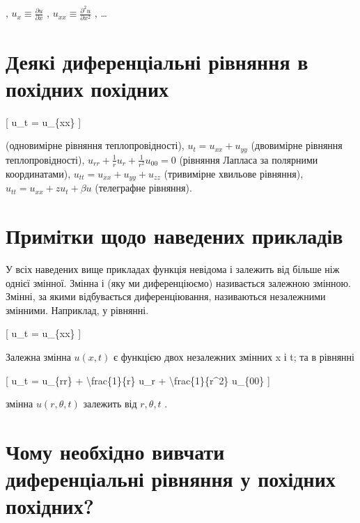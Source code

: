 \documentclass[
]{article}
\begin{document}
, \(u_x \equiv \frac{\partial u}{\partial x}\) ,
\(u_{xx} \equiv \frac{\partial^2 u}{\partial x^2}\) , \ldots{}

\section{Деякі диференціальні рівняння в похідних
похідних}\label{ux434ux435ux44fux43aux456-ux434ux438ux444ux435ux440ux435ux43dux446ux456ux430ux43bux44cux43dux456-ux440ux456ux432ux43dux44fux43dux43dux44f-ux432-ux43fux43eux445ux456ux434ux43dux438ux445-ux43fux43eux445ux456ux434ux43dux438ux445}

{[} u\_t = u\_\{xx\} {]}

(одновимірне рівняння теплопровідності), \(u_t = u_{xx} + u_{yy}\)
(двовимірне рівняння теплопровідності),
\(u_{rr} + \frac{1}{r}u_r + \frac{1}{r^2}u_{00} = 0\) (рівняння Лапласа
за полярними координатами), \(u_{tt} = u_{xx} + u_{yy} + u_{zz}\)
(тривимірне хвильове рівняння), \(u_{tt} = u_{xx} + zu_t + \beta u\)
(телеграфне рівняння).

\section{Примітки щодо наведених
прикладів}\label{ux43fux440ux438ux43cux456ux442ux43aux438-ux449ux43eux434ux43e-ux43dux430ux432ux435ux434ux435ux43dux438ux445-ux43fux440ux438ux43aux43bux430ux434ux456ux432}

У всіх наведених вище прикладах функція невідома і залежить від більше
ніж однієї змінної. Змінна і (яку ми диференціюємо) називається залежною
змінною. Змінні, за якими відбувається диференціювання, називаються
незалежними змінними. Наприклад, у рівнянні.

{[} u\_t = u\_\{xx\} {]}

Залежна змінна \(u(x, t)\) є функцією двох незалежних змінних x і t; та
в рівнянні

{[} u\_t = u\_\{rr\} + \textbackslash frac\{1\}\{r\} u\_r +
\textbackslash frac\{1\}\{r\^{}2\} u\_\{00\} {]}

змінна \(u(r, \theta, t)\) залежить від \(r, \theta, t\) .

\section{Чому необхідно вивчати диференціальні рівняння у похідних
похідних?}\label{ux447ux43eux43cux443-ux43dux435ux43eux431ux445ux456ux434ux43dux43e-ux432ux438ux432ux447ux430ux442ux438-ux434ux438ux444ux435ux440ux435ux43dux446ux456ux430ux43bux44cux43dux456-ux440ux456ux432ux43dux44fux43dux43dux44f-ux443-ux43fux43eux445ux456ux434ux43dux438ux445-ux43fux43eux445ux456ux434ux43dux438ux445}
\end{document}
